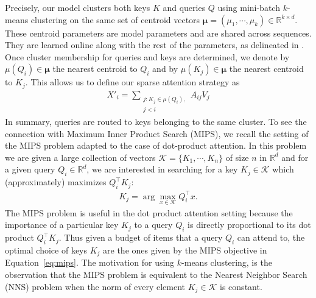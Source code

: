 \documentclass[a4paper]{article}
\begin{document}
Precisely, our model clusters both keys \(K\) and queries \(Q\) 
using mini-batch \(k\)-means clustering on the same
set of centroid vectors 
$\bm{\mu} = (\mu_1, \cdots, \mu_k) \in \mathbb{R}^{k \times d}$. These
centroid parameters are model parameters and are shared across 
sequences. They are learned online along with the rest of the parameters, as 
delineated in \cite{bottou1995convergence}. 
Once cluster membership for queries and keys are determined, we
denote by \(\mu(Q_i)\in \bm{\mu}\) the nearest centroid to \(Q_i\) and
by \(\mu(K_j) \in \bm{\mu}\) the nearest centroid to \(K_j\).
This allows us to define our sparse attention strategy as
\begin{align}\label{eq:high-res}
    X'_i = \sum_{\substack{j: K_j \in \mu(Q_i),\\ j <i}} A_{ij}V_j
\end{align}
In summary, queries are routed to keys belonging to the same cluster.
To see the connection with Maximum Inner Product Search (MIPS), we recall
the setting of the MIPS problem adapted to the case of dot-product attention. 
In this problem we are given a large collection of vectors 
\(\mathcal{K} = \{K_1,\cdots, K_n\}\) of size \(n\) in \(\mathbb{R}^d\)
and for a given query \(Q_i \in \mathbb{R}^d\),
we are interested in searching for a key \(K_j \in \mathcal{K}\) which (approximately)
maximizes \(Q_i^\top K_j\):
\begin{align}\label{eq:mips}
    K_j = \arg\max_{x \in \mathcal{K}} Q_i^\top x.
\end{align}
The MIPS problem is useful in the dot product attention setting because the importance
of a particular key \(K_j\) to a query \(Q_i\) is directly proportional to its
dot product \(Q_i^\top K_j\). Thus given a budget of items that a query
\(Q_i\) can attend to, the optimal choice of keys \(K_j\) are the ones given by
the MIPS objective in Equation~\ref{eq:mips}. 
The motivation for using \(k\)-means clustering, is the
observation that the MIPS problem is equivalent to the Nearest Neighbor
Search (NNS) problem when the norm of every element \(K_j \in \mathcal{K}\) is
constant. 
\end{document}
